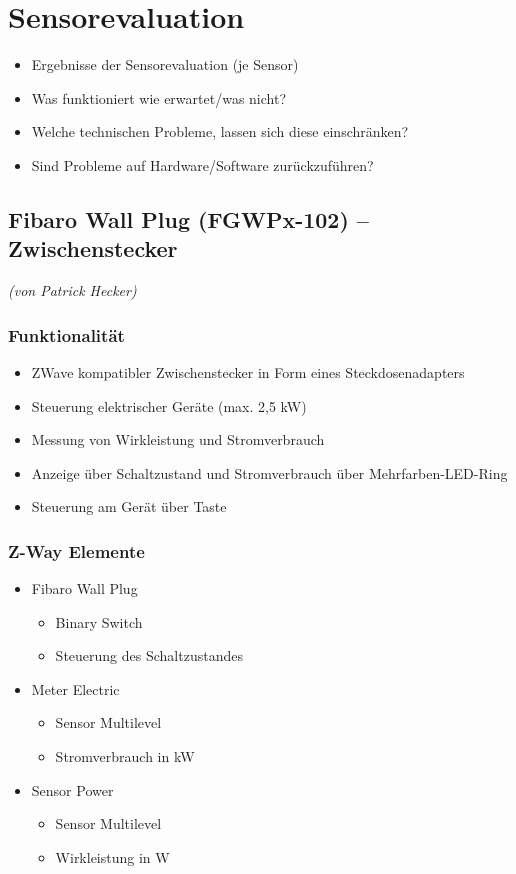 \section{Sensorevaluation}
\begin{itemize}
	\item Ergebnisse der Sensorevaluation (je Sensor)
	\item Was funktioniert wie erwartet/was nicht?
	\item Welche technischen Probleme, lassen sich diese einschränken?
	\item Sind Probleme auf Hardware/Software zurückzuführen?
\end{itemize}

\subsection{Fibaro Wall Plug (FGWPx-102) – Zwischenstecker}

\emph{(von Patrick Hecker)}
\subsubsection{Funktionalität}
\begin{itemize}
	\item ZWave kompatibler Zwischenstecker in Form eines Steckdosenadapters
	\item Steuerung elektrischer Geräte (max. 2,5 kW)
	\item Messung von Wirkleistung und Stromverbrauch
	\item Anzeige über Schaltzustand und Stromverbrauch über Mehrfarben-LED-Ring
	\item Steuerung am Gerät über Taste
\end{itemize}
\subsubsection{Z-Way Elemente}
\begin{itemize}
	\item Fibaro Wall Plug
	\begin{itemize}
		\item Binary Switch
		\item Steuerung des Schaltzustandes
	\end{itemize}
	\item Meter Electric
	\begin{itemize}
		\item Sensor Multilevel
		\item Stromverbrauch in kW
	\end{itemize}
	\item Sensor Power
	\begin{itemize}
		\item Sensor Multilevel
		\item Wirkleistung in W
	\end{itemize}
\end{itemize}

